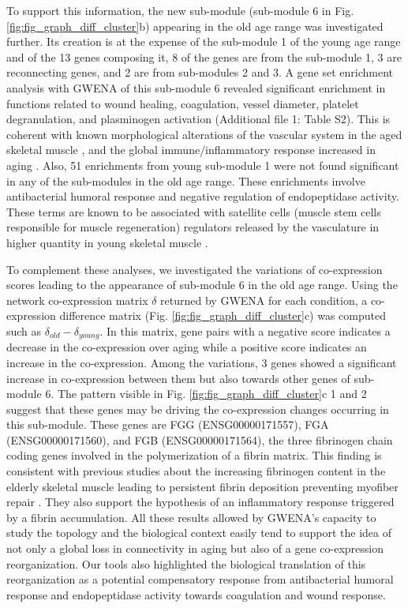 To support this information, the new sub-module (sub-module 6 in Fig. \ref{fig:fig_graph_diff_cluster}b) appearing in the old age range was investigated further. Its creation is at the expense of the sub-module 1 of the young age range and of the 13 genes composing it, 8 of the genes are from the sub-module 1, 3 are reconnecting genes, and 2 are from sub-modules 2 and 3. A gene set enrichment analysis with GWENA of this sub-module 6 revealed significant enrichment in functions related to wound healing, coagulation, vessel diameter, platelet degranulation, and plasminogen activation (Additional file 1: Table S2). This is coherent with known morphological alterations of the vascular system in the aged skeletal muscle , and the global immune/inflammatory response increased in aging . Also, 51 enrichments from young sub-module 1 were not found significant in any of the sub-modules in the old age range. These enrichments involve antibacterial humoral response and negative regulation of endopeptidase activity. These terms are known to be associated with satellite cells (muscle stem cells responsible for muscle regeneration) regulators released by the vasculature in higher quantity in young skeletal muscle . 

To complement these analyses, we investigated the variations of co-expression scores leading to the appearance of sub-module 6 in the old age range. Using the network co-expression matrix $\delta$ returned by GWENA for each condition, a co-expression difference matrix (Fig. \ref{fig:fig_graph_diff_cluster}c) was computed such as $\delta_{old} - \delta_{young}$. In this matrix, gene pairs with a negative score indicates a decrease in the co-expression over aging while a positive score indicates an increase in the co-expression. Among the variations, 3 genes showed a significant increase in co-expression between them but also towards other genes of sub-module 6. The pattern visible in Fig. \ref{fig:fig_graph_diff_cluster}c \textcircled{\small{1}} and \textcircled{\small{2}} suggest that these genes may be driving the co-expression changes occurring in this sub-module. These genes are FGG (ENSG00000171557), FGA (ENSG00000171560), and FGB (ENSG00000171564), the three fibrinogen chain coding genes involved in the polymerization of a fibrin matrix. This finding is consistent with previous studies about the increasing fibrinogen content in the elderly skeletal muscle leading to persistent fibrin deposition preventing myofiber repair . They also support the hypothesis of an inflammatory response triggered by a fibrin accumulation. All these results allowed by GWENA's capacity to study the topology and the biological context easily tend to support the idea of not only a global loss in connectivity in aging but also of a gene co-expression reorganization. Our tools also highlighted the biological translation of this reorganization as a potential compensatory response from antibacterial humoral response and endopeptidase activity towards coagulation and wound response.


